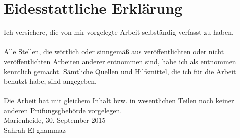 
\chapter*{Eidesstattliche Erklärung}
Ich versichere, die von mir vorgelegte Arbeit selbständig verfasst zu haben.\\ \\
Alle Stellen, die wörtlich oder sinngemäß aus veröffentlichten oder nicht veröffentlichten Arbeiten anderer entnommen sind, habe ich als entnommen kenntlich gemacht. Sämtliche Quellen und Hilfsmittel, die ich für die Arbeit benutzt habe, sind angegeben.\\ \\
Die Arbeit hat mit gleichem Inhalt bzw. in wesentlichen Teilen noch keiner anderen Prüfungsgbehörde vorgelegen.
\vspace{1.5cm}
\\
Marienheide, 30. September 2015
\vspace{3cm}
\\
Sahrah El ghammaz
